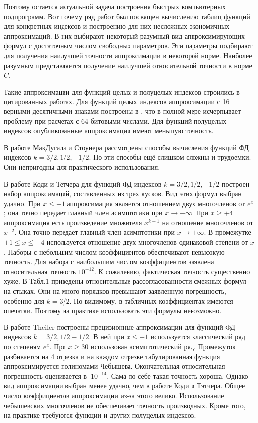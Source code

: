 Поэтому остается актуальной задача построения быстрых компьютерных подпрограмм. Вот почему
ряд работ был посвящен вычислению таблиц функций для конкретных
индексов и построению для них несложных экономичных аппроксимаций. В них выбирают некоторый
разумный вид аппроксимирующих формул с достаточным числом свободных
параметров. Эти параметры подбирают для получения наилучшей
точности аппроксимации в некоторой норме. Наиболее разумным
представляется получение наилучшей относительной точности в норме $C$.

Такие аппроксимации для функций целых и полуцелых индексов
строились в цитированных работах. Для функций целых индексов
аппроксимации с 16 верными десятичными знаками построены в \cite{KalitkinKolganov_PrecApprox}, что в
полной мере исчерпывает проблему при расчетах с 64-битовыми
числами. Для функций полуцелых индексов опубликованные
аппроксимации имеют меньшую точность. 

В работе МакДугала и Стоунера \cite{Stoner} рассмотрены способы вычисления функций ФД индексов \linebreak $k =3/2, 1/2, -1/2$. Но эти способы ещё слишком сложны и трудоемки. Они непригодны для практического использования.


В работе Коди и Тетчера \cite{Cody_Thatcher} для функций ФД индексов $k =3/2, 1/2, -1/2$ построен набор аппроксимаций, составленных из трех кусков. Вид этих формул выбран удачно. При $x \leqslant +1$ аппроксимация является отношением двух многочленов от $e^x$; она точно передает главный член асимптотики при $x \to -\infty$. При $x \geqslant +4$ аппроксимация есть произведение множителя $x^{k+1}$ на отношение многочленов от $x^{-2}$. Она точно передает главный член асимптотики при $x \to +\infty$. В промежутке $+1 \leqslant x \leqslant +4$ используется отношение двух многочленов одинаковой степени от $x$. Наборы с небольшим числом коэффициентов обеспечивают невысокую точность. Для набора с наибольшим числом коэффициентов заявлена относительная точность $10^{-12}$. К сожалению, фактическая точность существенно хуже. В Табл.1 приведены относительные рассогласованности смежных формул на стыках. Они на много порядков превышают заявленную погрешность, особенно для $k = 3/2$. По-видимому, в табличных коэффициентах имеются опечатки. Поэтому на практике использовать эти формулы невозможно. 

В работе Theiler \cite{Theiler} построены прецизионные аппроксимации для функций ФД индексов $k = 3/2, 1/2 -1/2$. В ней при $x \leqslant -1$ используется классический ряд по степеням $e^x$. При $x \geqslant 30$ использован асимптотический ряд. Промежуток разбивается на 4 отрезка и на каждом отрезке табулированная функция аппроксимируется полиномами Чебышева. Окончательная относительная погрешность оценивается в $~10^{-14}$. Сама по себе такая точность хороша. Однако вид аппроксимации выбран менее удачно, чем в работе Коди и Тэтчера. Общее число коэффициентов аппроксимации из-за этого велико. Использование чебышевских многочленов не обеспечивает точность производных. Кроме того, на практике требуются функции и других полуцелых индексов.

